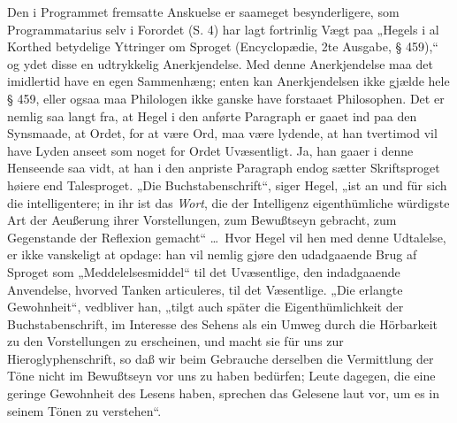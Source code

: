 \documentclass[12pt]{book}
\newcommand{\opage}[1]{\marginnote{\footnotesize\textit{[#1]}}}
\begin{document}
Den i Programmet fremsatte Anskuelse er saameget besynderligere,
som Programmatarius selv i Forordet (S. 4)
har lagt fortrinlig Vægt paa „Hegels i al Korthed betydelige
Yttringer om Sproget (Encyclopædie, 2te Ausgabe, § 459),“
og ydet disse en udtrykkelig Anerkjendelse. Med denne Anerkjendelse
maa det imidlertid have en egen Sammenhæng; enten
kan Anerkjendelsen ikke gjælde hele § 459, eller ogsaa maa
Philologen ikke ganske have forstaaet Philosophen. Det er
nemlig saa langt fra, at Hegel i den anførte Paragraph er
gaaet ind paa den Synsmaade, at Ordet, for at være Ord,
maa være lydende, at han tvertimod vil have Lyden anseet
som noget for Ordet Uvæsentligt. Ja, han gaaer i denne
Henseende saa vidt, at han i den anpriste Paragraph endog
sætter Skriftsproget høiere end Talesproget. „Die Buchstabenschrift“,
siger Hegel, „ist an und für sich die intelligentere; in
ihr ist das \emph{Wort}, die der Intelligenz eigenthümliche würdigste
Art der Aeußerung ihrer Vorstellungen, zum Bewußtseyn gebracht,
zum Gegenstande der Reflexion gemacht“ \dots\ Hvor
Hegel vil hen med denne Udtalelse, er ikke vanskeligt at opdage:
han vil nemlig gjøre den udadgaaende Brug af Sproget
som „Meddelelsesmiddel“ til det Uvæsentlige, den indadgaaende
Anvendelse, hvorved Tanken articuleres, til det Væsentlige.
„Die erlangte Gewohnheit“, vedbliver han, „tilgt auch später
die Eigenthümlichkeit der Buchstabenschrift, im Interesse des
\opage{25}Sehens als ein Umweg durch die Hörbarkeit zu den Vorstellungen
zu erscheinen, und macht sie für uns zur Hieroglyphenschrift,
so daß wir beim Gebrauche derselben die Vermittlung
der Töne nicht im Bewußtseyn vor uns zu haben
bedürfen; Leute dagegen, die eine geringe Gewohnheit des
Lesens haben, sprechen das Gelesene laut vor, um es in seinem
Tönen zu verstehen“.
\end{document}
